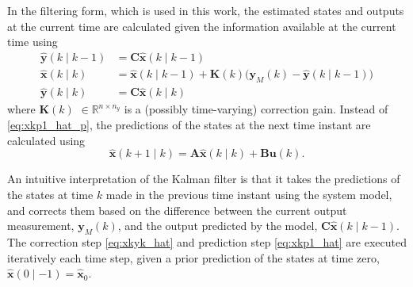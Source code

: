 {In the filtering form, which is used in this work, the estimated states and outputs at the current time are calculated given the information available at the current time using
\begin{equation} \label{eq:xkyk_hat}
	\begin{aligned}
		\mathbf{\hat{y}}(k \mid k-1) &= \mathbf{C} \mathbf{\hat{x}}(k \mid k-1) \\
		\mathbf{\hat{x}}(k \mid k) &= \mathbf{\hat{x}}(k \mid k-1) + \mathbf{K}(k) \big( \mathbf{y}_M(k) - \mathbf{\hat{y}}(k \mid k-1)  \big) \\
		\mathbf{\hat{y}}(k \mid k) &= \mathbf{C} \mathbf{\hat{x}}(k \mid k)
	\end{aligned}
\end{equation}
%
%
where $\mathbf{K}(k)$ $\in \mathbb{R}^{n \times n_y}$ is a (possibly time-varying) correction gain. Instead of \eqref{eq:xkp1_hat_p}, the predictions of the states at the next time instant are calculated using
%
%
%
\begin{equation} \label{eq:xkp1_hat}
	\mathbf{\hat{x}}(k+1 \mid k) = \mathbf{A} \mathbf{\hat{x}}(k \mid k) + \mathbf{B} \mathbf{u}(k).
\end{equation}

An intuitive interpretation of the Kalman filter is that it takes the predictions of the states at time $k$ made in the previous time instant using the system model, and corrects them based on the difference between the current output measurement, $\mathbf{y}_M(k)$, and the output predicted by the model, $\mathbf{C} \mathbf{\hat{x}}(k \mid k-1)$. The correction step \eqref{eq:xkyk_hat} and prediction step \eqref{eq:xkp1_hat} are executed iteratively each time step, given a prior prediction of the states at time zero, $\mathbf{\hat{x}}(0 \mid -1)=\mathbf{\hat{x}}_0$.
%

}
